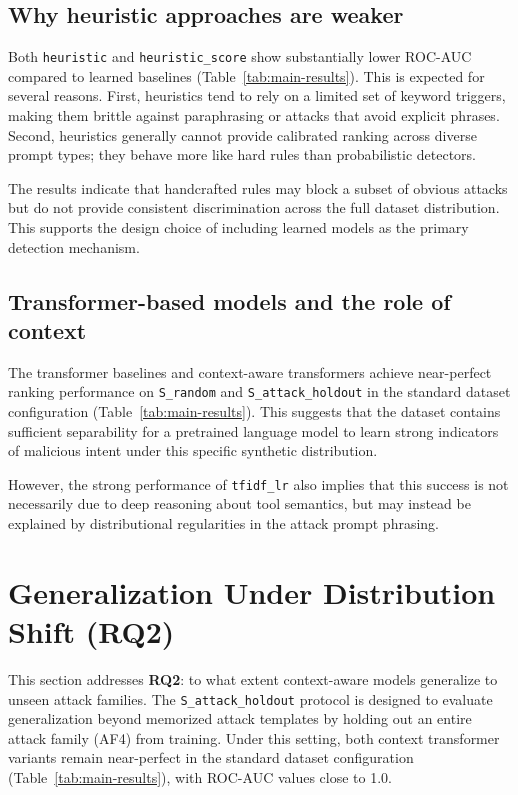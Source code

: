 \subsection{Why heuristic approaches are weaker}

Both \texttt{heuristic} and \texttt{heuristic\_score} show substantially lower ROC-AUC compared to learned baselines (Table~\ref{tab:main-results}). This is expected for several reasons. First, heuristics tend to rely on a limited set of keyword triggers, making them brittle against paraphrasing or attacks that avoid explicit phrases. Second, heuristics generally cannot provide calibrated ranking across diverse prompt types; they behave more like hard rules than probabilistic detectors.

The results indicate that handcrafted rules may block a subset of obvious attacks but do not provide consistent discrimination across the full dataset distribution. This supports the design choice of including learned models as the primary detection mechanism.

\subsection{Transformer-based models and the role of context}

The transformer baselines and context-aware transformers achieve near-perfect ranking performance on \texttt{S\_random} and \texttt{S\_attack\_holdout} in the standard dataset configuration (Table~\ref{tab:main-results}). This suggests that the dataset contains sufficient separability for a pretrained language model to learn strong indicators of malicious intent under this specific synthetic distribution.

However, the strong performance of \texttt{tfidf\_lr} also implies that this success is not necessarily due to deep reasoning about tool semantics, but may instead be explained by distributional regularities in the attack prompt phrasing.

\section{Generalization Under Distribution Shift (RQ2)}
\label{subsec:discussion_generalization}

This section addresses \textbf{RQ2}: to what extent context-aware models generalize to unseen attack families. The \texttt{S\_attack\_holdout} protocol is designed to evaluate generalization beyond memorized attack templates by holding out an entire attack family (AF4) from training. Under this setting, both context transformer variants remain near-perfect in the standard dataset configuration (Table~\ref{tab:main-results}), with ROC-AUC values close to 1.0.

